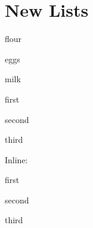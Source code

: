 \documentclass{article}
\begin{document}
\section{New Lists}



\begin{ingredients}
\item flour
\item eggs
\item milk
\end{ingredients}

\begin{steps}
\item first
\item second
\item third
\end{steps}

Inline:
\begin{isteps}
\item first
\item second
\item third
\end{isteps}
\end{document}
